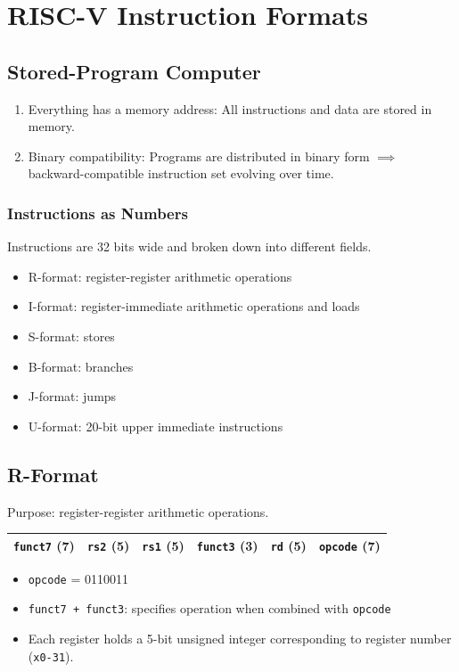 \chapter{RISC-V Instruction Formats}

\section{Stored-Program Computer}
\begin{enumerate}
    \item Everything has a memory address: All instructions and data are stored in memory.
    \item Binary compatibility: Programs are distributed in binary form $\implies$ backward-compatible instruction set evolving over time.
\end{enumerate}

\subsection{Instructions as Numbers}
Instructions are 32 bits wide and broken down into different fields.
\begin{itemize}
    \item R-format: register-register arithmetic operations
    \item I-format: register-immediate arithmetic operations and loads
    \item S-format: stores
    \item B-format: branches
    \item J-format: jumps
    \item U-format: 20-bit upper immediate instructions
\end{itemize}

\section{R-Format}
Purpose: register-register arithmetic operations.

\medskip
\begin{tabular}{|c|c|c|c|c|c|}
    \hline
    \texttt{funct7} (7) &
    \texttt{rs2} (5) &
    \texttt{rs1} (5) &
    \texttt{funct3} (3) &
    \texttt{rd} (5) &
    \texttt{opcode} (7) \\
    \hline
\end{tabular}
\begin{itemize}
    \item \texttt{opcode} = 0110011
    \item \texttt{funct7 + funct3}: specifies operation when combined with \texttt{opcode}
    \item Each register holds a 5-bit unsigned integer corresponding to register number (\texttt{x0-31}).
\end{itemize}

